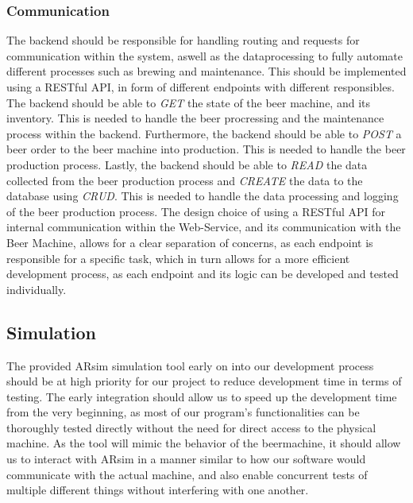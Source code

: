 \subsubsection{Communication}
The backend should be responsible for handling routing and requests for communication within the system, aswell as the dataprocessing to fully automate different processes such as brewing and maintenance. This should be implemented using a RESTful API, in form of different endpoints with different responsibles. \newline 
The backend should be able to \textit{GET} the state of the beer machine, and its inventory. This is needed to handle the beer procressing and the maintenance process within the backend.\newline
Furthermore, the backend should be able to \textit{POST} a beer order to the beer machine into production. This is needed to handle the beer production process.\newline
Lastly, the backend should be able to \textit{READ} the data collected from the beer production process and \textit{CREATE} the data to the database using \textit{CRUD}. This is needed to handle the data processing and logging of the beer production process.
The design choice of using a RESTful API for internal communication within the Web-Service, and its communication with the Beer Machine, allows for a clear separation of concerns, as each endpoint is responsible for a specific task, which in turn allows for a more efficient development process, as each endpoint and its logic can be developed and tested individually.

\subsection{Simulation}
The provided ARsim simulation tool early on into our development process should be at high priority for our project to reduce development time in terms of testing. 
The early integration should allow us to speed up the development time from the very beginning, as most of our program's functionalities can be thoroughly tested directly without the need for direct access to the physical machine.
As the tool will mimic the behavior of the beermachine, it should allow us to interact with ARsim in a manner similar to how our software would communicate with the actual machine, and also enable concurrent tests of multiple different things without interfering with one another.

